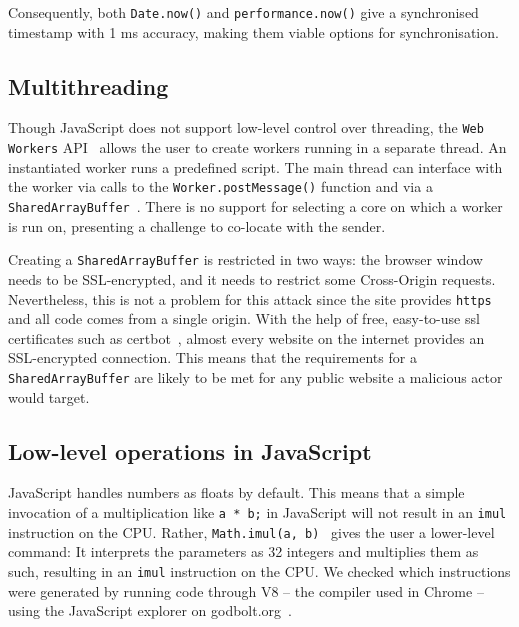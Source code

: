 \documentclass[11pt,
  titlepage=false,
]{scrreprt}
\begin{document}
Consequently, both \texttt{Date.now()} and \texttt{performance.now()} give a synchronised timestamp with 1 ms accuracy, making them viable options for synchronisation.

\subsection{Multithreading}\label{subsec:multithreading}
Though JavaScript does not support low-level control over threading, the \texttt{Web Workers} API~\cite{webworkers} allows the user to create workers running in a separate thread.
An instantiated worker runs a predefined script.
The main thread can interface with the worker via calls to the \texttt{Worker.postMessage()} function and via a \texttt{SharedArrayBuffer}~\cite{sharedarraybuffer}.
There is no support for selecting a core on which a worker is run on, presenting a challenge to co-locate with the sender.

Creating a \texttt{SharedArrayBuffer} is restricted in two ways: the browser window needs to be SSL-encrypted, and it needs to restrict some Cross-Origin requests.
Nevertheless, this is not a problem for this attack since the site provides \texttt{https} and all code comes from a single origin.
With the help of free, easy-to-use ssl certificates such as certbot~\cite{certbot}, almost every website on the internet provides an SSL-encrypted connection.
This means that the requirements for a \texttt{SharedArrayBuffer} are likely to be met for any public website a malicious actor would target.

\subsection{Low-level operations in JavaScript}\label{subsec:lowleveljs}
JavaScript handles numbers as floats by default.
This means that a simple invocation of a multiplication like \texttt{a * b;} in JavaScript will not result in an \texttt{imul} instruction on the CPU.
Rather, \texttt{Math.imul(a, b)}~\cite{mathimul} gives the user a lower-level command:
It interprets the parameters as \SI{32}{\bit} integers and multiplies them as such, resulting in an \texttt{imul} instruction on the CPU.
We checked which instructions were generated by running code through V8 -- the compiler used in Chrome --
using the JavaScript explorer on godbolt.org~\cite{godbolt}.
\end{document}
